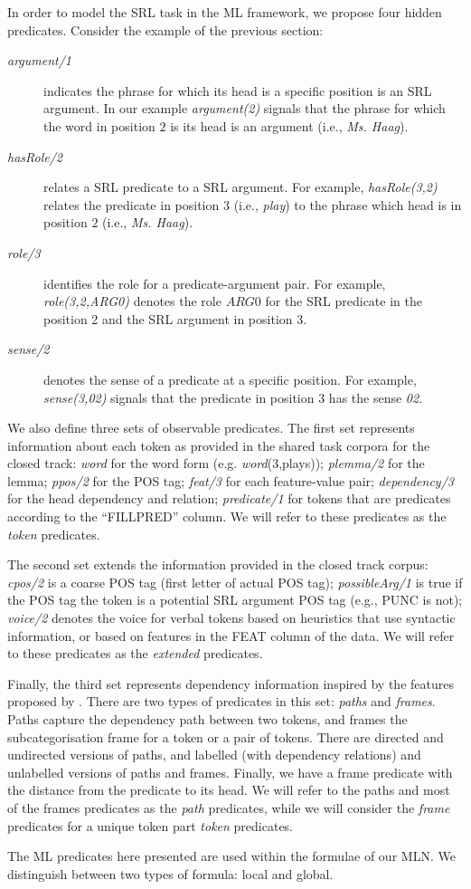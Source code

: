 
In order to model the SRL task in the ML framework, we propose four hidden 
predicates. Consider the example of the previous section:
\begin{description}
    \item [\emph{argument/1}] indicates the phrase for which its head is a 
        specific position is an SRL argument. In our example     
        \emph{argument(2)} signals that the phrase for which the word in 
        position $2$ is its head is an argument (i.e., \emph{Ms. Haag}).
    \item [\emph{hasRole/2}] relates a SRL predicate to a SRL argument. For example, \emph{hasRole(3,2)} relates the
        predicate in position $3$ (i.e., \emph{play}) to the phrase which head 
        is in position $2$ (i.e., \emph{Ms. Haag}).
    \item [\emph{role/3}] identifies the role for a predicate-argument pair. For 
        example,
        \emph{role(3,2,ARG0)} denotes the role $ARG0$ for the SRL predicate in 
        the position 2 and the SRL argument in position 3.
    \item [\emph{sense/2}] denotes the sense of a predicate at a
        specific position. For example, \emph{sense(3,02)}
        signals that the predicate in position $3$ has the sense \emph{02}.
\end{description}

We also define three sets of observable predicates. The first set represents 
information about each token as provided in the shared task corpora for the 
closed track:  \emph{word} for the word form (e.g. \emph{word}(3,plays)); 
\emph{plemma/2} for the lemma; \emph{ppos/2} for the POS tag; \emph{feat/3} for 
each feature-value pair; \emph{dependency/3} for the head dependency and 
relation; \emph{predicate/1} for tokens that are predicates according to the 
``FILLPRED'' column. We will refer to these predicates as the \emph{token} 
predicates. 

The second set extends the information provided in the closed track corpus: 
\emph{cpos/2} is a coarse POS tag (first letter of actual POS tag); \emph{possibleArg/1} is true if the POS tag the token is a potential SRL argument  POS tag (e.g., PUNC is not); \emph{voice/2} denotes the voice for verbal tokens based on heuristics that use
syntactic information, or based on features in the FEAT column of the data. We will 
refer to these predicates as the \emph{extended} predicates.

Finally, the third set represents dependency information inspired by the features proposed by \citet{xue04calibrating}. There are two types of 
predicates in this set: \emph{paths} and \emph{frames}.  Paths capture the 
dependency path between two tokens, and frames the subcategorisation frame for a 
token or a pair of tokens. There are directed and 
undirected versions of paths, and labelled  (with dependency relations) and unlabelled versions of paths and frames. Finally, we have a frame predicate with the distance from the 
predicate to its head.  We will refer to the paths and most of the frames 
predicates as the \emph{path} predicates, while we will consider the 
\emph{frame} predicates for a unique token part \emph{token} predicates.

The ML predicates here presented are used within the formulae of our MLN.  We 
distinguish between two types of formula: local and global. 
